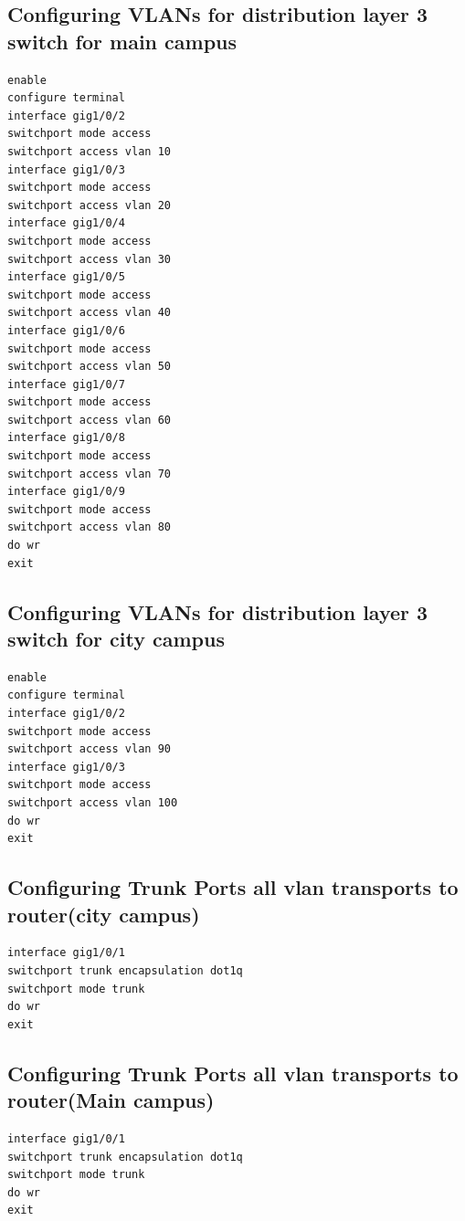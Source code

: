 \documentclass[12pt]{article}
\begin{document}
\subsection{Configuring VLANs for distribution layer 3 switch for main campus}
\begin{verbatim}
enable
configure terminal
interface gig1/0/2
switchport mode access
switchport access vlan 10
interface gig1/0/3
switchport mode access
switchport access vlan 20
interface gig1/0/4
switchport mode access
switchport access vlan 30
interface gig1/0/5
switchport mode access
switchport access vlan 40
interface gig1/0/6
switchport mode access
switchport access vlan 50
interface gig1/0/7
switchport mode access
switchport access vlan 60
interface gig1/0/8
switchport mode access
switchport access vlan 70
interface gig1/0/9
switchport mode access
switchport access vlan 80
do wr
exit

\end{verbatim}

\subsection{Configuring VLANs for distribution layer 3 switch for city campus}
\begin{verbatim}
enable
configure terminal
interface gig1/0/2
switchport mode access
switchport access vlan 90
interface gig1/0/3
switchport mode access
switchport access vlan 100
do wr
exit

\end{verbatim}




\subsection{Configuring Trunk Ports all vlan transports to router(city campus)}
\begin{verbatim}
interface gig1/0/1
switchport trunk encapsulation dot1q
switchport mode trunk 
do wr
exit
\end{verbatim}

\subsection{Configuring Trunk Ports all vlan transports to router(Main campus)}
\begin{verbatim}
interface gig1/0/1
switchport trunk encapsulation dot1q
switchport mode trunk 
do wr
exit
\end{verbatim}
\end{document}

